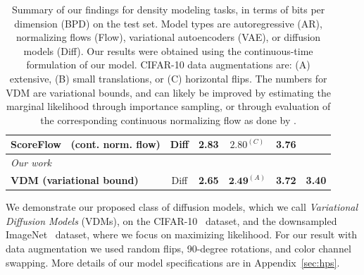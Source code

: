 \documentclass{article}
\begin{document}
\begin{table}[t]
\begin{center}
\begin{tabular}{lccccc}
ScoreFlow~\citep{song2021maximum} (cont. norm. flow) & Diff & 2.83 & $2.80^{(C)}$ & 3.76 & \\
\midrule
\textit{Our work}\\
\textbf{VDM (variational bound)} & Diff & \textbf{2.65} & $\textbf{2.49}^{(A)}$ & \textbf{3.72} & \textbf{3.40} %
\\
\bottomrule
%
\end{tabular}
%
\end{center}
\caption{Summary of our findings for density modeling tasks, in terms of bits per dimension (BPD) on the test set. Model types are autoregressive (AR), normalizing flows (Flow), variational autoencoders (VAE), or diffusion models (Diff). Our results were obtained using the continuous-time formulation of our model. CIFAR-10 data augmentations are: (A) extensive, (B) small translations, or (C) horizontal flips. The numbers for VDM are variational bounds, and can likely be improved by estimating the marginal likelihood through importance sampling, or through evaluation of the corresponding continuous normalizing flow as done by \cite{song2021maximum}.}
\label{table:results}
\end{table}

We demonstrate our proposed class of diffusion models, which we call \emph{Variational Diffusion Models} (VDMs), on the CIFAR-10~\citep{krizhevsky2009learning} dataset, and the downsampled ImageNet~\citep{van2016pixel, deng2009imagenet} dataset, where we focus on maximizing likelihood. For our result with data augmentation we used random flips, 90-degree rotations, and color channel swapping. More details of our model specifications are in Appendix~\ref{sec:hps}.

%
\end{document}
